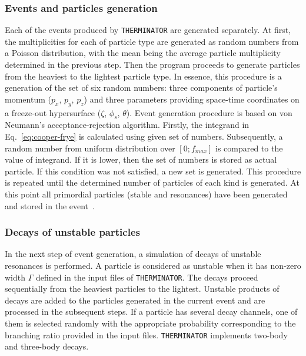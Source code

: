     \subsubsection{Events and particles generation}
      Each of the events produced by \verb|THERMINATOR| are generated separately.
      At first, the multiplicities for each of particle type are generated as random numbers from a Poisson distribution, with the mean being the average particle multiplicity determined in the previous step.
      Then the program proceeds to generate particles from the heaviest to the lightest particle type.
      In essence, this procedure is a generation of the set of six random numbers: three components of particle's momentum ($p_x$, $p_y$, $p_z$) and three parameters providing space-time coordinates on a freeze-out hypersurface ($\zeta$, $\phi_s$, $\theta$).
      Event generation procedure is based on von Neumann's acceptance-rejection algorithm.
      Firstly, the integrand in Eq.~\ref{eq:cooper-frye} is calculated using given set of numbers.
      Subsequently, a random number from uniform distribution over $[0;f_{max}]$ is compared to the value of integrand.
      If it is lower, then the set of numbers is stored as actual particle.
      If this condition was not satisfied, a new set is generated.
      This procedure is repeated until the determined number of particles of each kind is generated.
      At this point all primordial particles (stable and resonances) have been generated and stored in the event~\cite{therminator}.
    \subsubsection{Decays of unstable particles}
      In the next step of event generation, a simulation of decays of unstable resonances is performed.
      A particle is considered as unstable when it has non-zero width $\Gamma$ defined in the input files of \verb|THERMINATOR|.
      The decays proceed sequentially from the heaviest particles to the lightest.
      Unstable products of decays are added to the particles generated in the current event and are processed in the subsequent steps.
      If a particle has several decay channels, one of them is selected randomly with the appropriate probability corresponding to the branching ratio provided in the input files.
      \verb|THERMINATOR| implements two-body and three-body decays.


